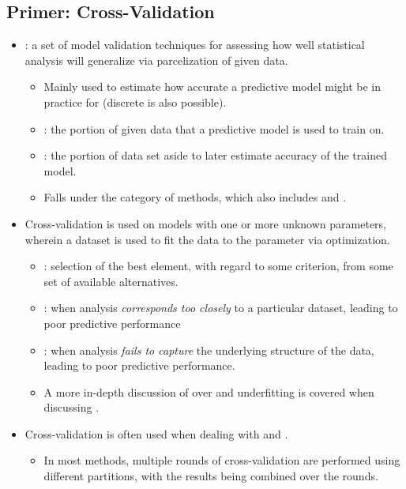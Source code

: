 \begin{itemize}
  \subsection{Primer: Cross-Validation}
    \begin{itemize}
    \item {}: a set of model validation techniques for assessing how well statistical analysis will generalize via parcelization of given data. 
      \begin{itemize}
        \item Mainly used to estimate how accurate a predictive model might be in practice for \hyperref[Subsection: Data Types]{} (discrete is also possible).
        \item {}: the portion of given data that a predictive model is used to train on. 
        \item {}: the portion of data set aside to later estimate accuracy of the trained model.
        \item Falls under the category of  methods, which also includes \hyperref[Subsection: Primer: Permutation Testing]{} and \hyperref[Subsection: Primer: Bootstrapping]{}.
      \end{itemize}
    \item Cross-validation is used on models with one or more unknown parameters, wherein a dataset is used to fit the data to the parameter via optimization.
      \begin{itemize}
        \item {}: selection of the best element, with regard to some criterion, from some set of available alternatives.
        \item {}: when analysis \emph{corresponds too closely} to a particular dataset, leading to poor predictive performance
        \item {}: when analysis \emph{fails to capture} the underlying structure of the data, leading to poor predictive performance.
        \item A more in-depth discussion of over and underfitting is covered when discussing \hyperref[Subsection: Nested Models]{}.
      \end{itemize}
    \item Cross-validation is often used when dealing with \hyperref[Chapter: Regression]{} and \hyperref[Section: Confidence Intervals]{}.
      \begin{itemize}
        \item In most methods, multiple rounds of cross-validation are performed using different partitions, with the results being combined over the rounds.
      \end{itemize}
  \end{itemize}


\end{itemize}
